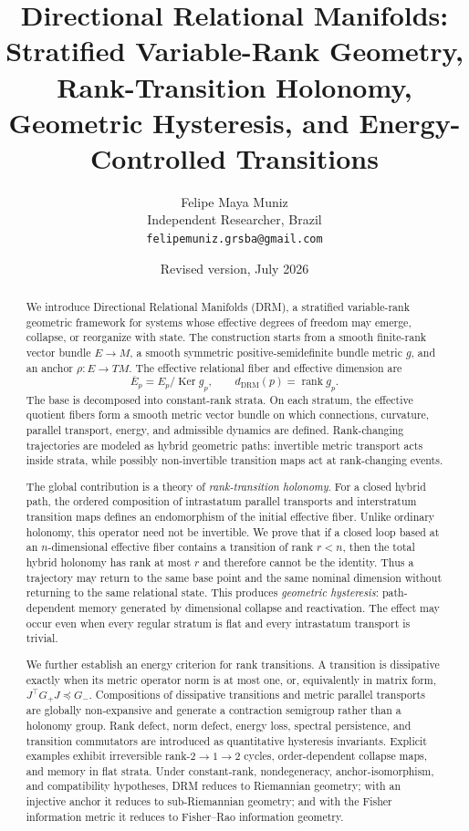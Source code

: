 \documentclass[11pt]{article}
\title{
Directional Relational Manifolds:\\
\large Stratified Variable-Rank Geometry, Rank-Transition Holonomy,\\
Geometric Hysteresis, and Energy-Controlled Transitions
}
\author{
Felipe Maya Muniz\\
Independent Researcher, Brazil\\
\texttt{felipemuniz.grsba@gmail.com}
}
\date{Revised version, July 2026}
\newcommand{\Ker}{\operatorname{Ker}}
\newcommand{\rank}{\operatorname{rank}}
\begin{document}
\maketitle

\begin{abstract}
We introduce Directional Relational Manifolds (DRM), a stratified
variable-rank geometric framework for systems whose effective degrees of
freedom may emerge, collapse, or reorganize with state. The construction
starts from a smooth finite-rank vector bundle $E\to M$, a smooth symmetric
positive-semidefinite bundle metric $g$, and an anchor $\rho:E\to TM$. The
effective relational fiber and effective dimension are
\[
\overline E_p=E_p/\Ker g_p,
\qquad
d_{\mathrm{DRM}}(p)=\rank g_p.
\]
The base is decomposed into constant-rank strata. On each stratum, the
effective quotient fibers form a smooth metric vector bundle on which
connections, curvature, parallel transport, energy, and admissible dynamics
are defined. Rank-changing trajectories are modeled as hybrid geometric
paths: invertible metric transport acts inside strata, while possibly
non-invertible transition maps act at rank-changing events.

The global contribution is a theory of \emph{rank-transition holonomy}. For a
closed hybrid path, the ordered composition of intrastatum parallel transports
and interstratum transition maps defines an endomorphism of the initial
effective fiber. Unlike ordinary holonomy, this operator need not be
invertible. We prove that if a closed loop based at an $n$-dimensional
effective fiber contains a transition of rank $r<n$, then the total hybrid
holonomy has rank at most $r$ and therefore cannot be the identity. Thus a
trajectory may return to the same base point and the same nominal dimension
without returning to the same relational state. This produces
\emph{geometric hysteresis}: path-dependent memory generated by dimensional
collapse and reactivation. The effect may occur even when every regular
stratum is flat and every intrastatum transport is trivial.

We further establish an energy criterion for rank transitions. A transition
is dissipative exactly when its metric operator norm is at most one, or,
equivalently in matrix form, $J^{\top}G_+J\preceq G_-$. Compositions of
dissipative transitions and metric parallel transports are globally
non-expansive and generate a contraction semigroup rather than a holonomy
group. Rank defect, norm defect, energy loss, spectral persistence, and
transition commutators are introduced as quantitative hysteresis invariants.
Explicit examples exhibit irreversible rank-$2\to1\to2$ cycles,
order-dependent collapse maps, and memory in flat strata. Under constant-rank,
nondegeneracy, anchor-isomorphism, and compatibility hypotheses, DRM reduces
to Riemannian geometry; with an injective anchor it reduces to
sub-Riemannian geometry; and with the Fisher information metric it reduces to
Fisher--Rao information geometry.
\end{abstract}
\end{document}
